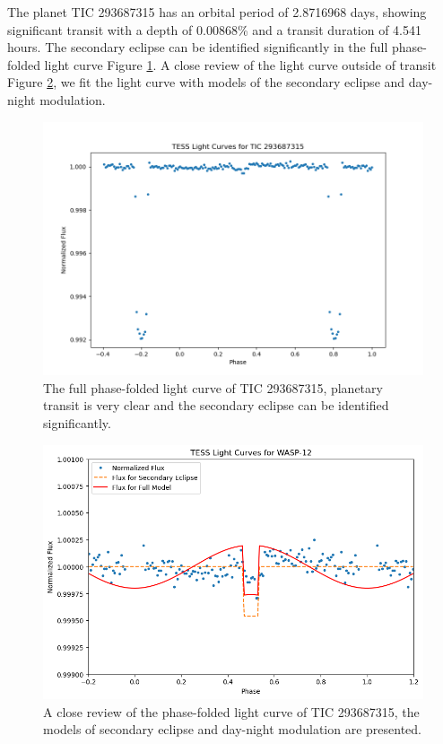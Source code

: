 \documentclass{article}
\begin{document}
The planet TIC 293687315 has an orbital period of 2.8716968 days, showing significant transit with a depth of 0.00868\% and a transit duration of 4.541 hours. The secondary eclipse can be identified significantly in the full phase-folded light curve Figure \ref{fig:293687315_folded}. A close review of the light curve outside of transit Figure \ref{fig:293687315}, we fit the light curve with models of the secondary eclipse and day-night modulation.\begin{figure}[H]\centering\includegraphics[width=0.7\linewidth]{image/293687315_folded.png}\captionsetup{font=small} \caption{The full phase-folded light curve of TIC 293687315, planetary transit is very clear and the secondary eclipse can be identified significantly.}\label{fig:293687315_folded}\end{figure}\begin{figure}[H]\centering\includegraphics[width=0.65\linewidth]{image/293687315.png}\captionsetup{font=small} \caption{A close review of the phase-folded light curve of TIC 293687315, the models of secondary eclipse and day-night modulation are presented.}\label{fig:293687315}\end{figure}
\newpage
\end{document}
